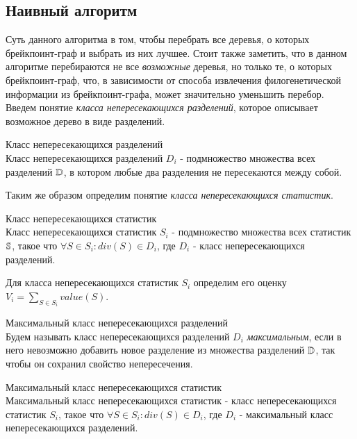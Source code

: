 \subsection{Наивный алгоритм}
Суть данного алгоритма в том, чтобы перебрать все деревья, о которых  брейкпоинт-граф и выбрать из них лучшее.
Стоит также заметить, что в данном алгоритме перебираются не все \emph{возможные} деревья, но только те, о которых  брейкпоинт-граф,
что, в зависимости от способа извлечения филогенетической информации из брейкпоинт-графа, может значительно уменьшить перебор.
Введем понятие \textit{класса непересекающихся разделений}, которое описывает возможное дерево в виде разделений.
\begin{define}{Класс непересекающихся разделений} \\
  Класс непересекающихся разделений $D_i$ - подмножество множества всех разделений $\mathbb{D}$,
  в котором любые два разделения не пересекаются между собой.
\end{define}

\noindent Таким же образом определим понятие \textit{класса непересекающихся статистик}.
\begin{define}{Класс непересекающихся статистик}\\
  Класс непересекающихся статистик $S_i$ - подмножество множества всех статистик $\mathbb{S}$,
  такое что $\forall S \in S_i: div(S) \in D_i$,
  где $D_i$ -  класс непересекающихся разделений.
\end{define}

\noindent Для класса непересекающихся статистик $S_i$ определим его оценку \\
$V_i = \sum\nolimits_{S \in S_i} value(S)$.

\begin{define}{Максимальный класс непересекающихся разделений} \\
  Будем называть класс непересекающихся разделений $D_i$ \textit{максимальным},
  если в него невозможно добавить новое разделение из множества разделений $\mathbb{D}$,
  так чтобы он сохранил свойство непересечения.
\end{define}

\begin{define}{Максимальный класс непересекающихся статистик} \\
  Максимальный класс непересекающихся статистик - класс непересекающихся статистик $S_i$,
  такое что $\forall S \in S_i: div(S) \in D_i$,
  где $D_i$ - максимальный класс непересекающихся разделений.
\end{define}


